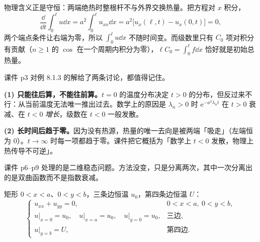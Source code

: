 物理含义正是守恒：两端绝热时整根杆不与外界交换热量。把方程对 $x$ 积分，
\begin{equation}
  \frac{\dd}{\dd t}\int_0^{\ell}u\dd x=a^2\int_0^{\ell}u_{xx}\dd x=a^2\big[u_x(\ell,t)-u_x(0,t)\big]=0,
\end{equation}
两个端点条件让右端为零，所以 $\int_0^\ell u\dd x$ 不随时间变。而级数里只有 $C_0$ 项对积分有贡献（$n\ge1$ 的 $\cos$ 在一个周期内积分为零），$\ell C_0=\int_0^\ell f\dd x$ 恰好就是初始总热量。



课件 p3 对例 8.1.3 的解给了两条讨论，都值得记住。

\textbf{(1) 只能往后算，不能往前算。}$t=0$ 的温度分布决定 $t>0$ 的分布，但反过来不行：从当前温度无法唯一推出过去。数学上的原因是 $\lambda_n>0$ 时 $\mathrm e^{-a^2\lambda_nt}$ 在 $t>0$ 衰减、在 $t<0$ \emph{增长}，级数在 $t<0$ 一般发散。

\textbf{(2) 长时间后趋于零。}因为没有热源，热量的唯一去向是被两端「吸走」（左端恒为 0）。$t\to\infty$ 时每一项都趋于零。课件把它概括为「数学上 $t<0$ 发散，物理上热传导不可逆」。






课件 p6--p9 处理的是二维稳态问题。方法没变，只是分离两次，其中一次分离出的是双曲函数而不是指数衰减。


矩形 $0<x<a$、$0<y<b$，三条边恒温 $u_0$，第四条边恒温 $U$：
\begin{equation}
  \begin{cases}
    u_{xx}+u_{yy}=0, & 0<x<a,\ 0<y<b,\\
    u\big|_{x=0}=u_0,\quad u\big|_{x=a}=u_0,\quad u\big|_{y=0}=u_0, & \text{三边},\\
    u\big|_{y=b}=U, & \text{第四边}.
  \end{cases}
\end{equation}

